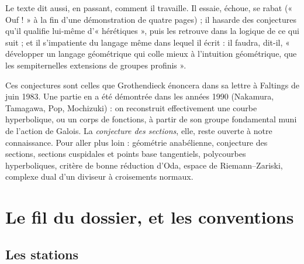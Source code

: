 \documentclass[11pt,a4paper]{article}
\begin{document}
\begin{resume}
Le texte dit aussi, en passant, comment il travaille. Il essaie, échoue, se
rabat (« Ouf ! » à la fin d'une démonstration de quatre pages) ; il hasarde
des conjectures qu'il qualifie lui-même d'« hérétiques », puis les retrouve
dans la logique de ce qui suit ; et il s'impatiente du langage même dans
lequel il écrit : il faudra, dit-il, « développer un langage géométrique qui
colle mieux à l'intuition géométrique, que les sempiternelles extensions de
groupes profinis ».

Ces conjectures sont celles que Grothendieck énoncera dans sa lettre à
Faltings de juin 1983. Une partie en a été démontrée dans les années 1990
(Nakamura, Tamagawa, Pop, Mochizuki) : on reconstruit effectivement une
courbe hyperbolique, ou un corps de fonctions, à partir de son groupe
fondamental muni de l'action de Galois. La \emph{conjecture des sections},
elle, reste ouverte à notre connaissance. Pour aller plus loin : géométrie
anabélienne, conjecture des sections, sections cuspidales et points base
tangentiels, polycourbes hyperboliques, critère de bonne réduction d'Oda,
espace de Riemann–Zariski, complexe dual d'un diviseur à croisements normaux.

\end{resume}

\section*{Le fil du dossier, et les conventions}

\subsection*{Les stations}
\end{document}

